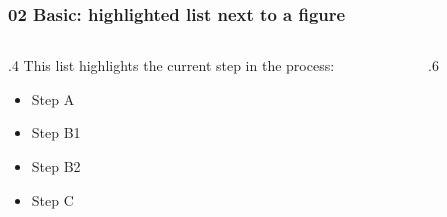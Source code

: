 
\begin{frame}
    \frametitle{02 Basic: highlighted list next to a figure}

    \newcommand{\stepNeutral}{1}
    \newcommand{\stepA}{2}
    \newcommand{\stepBOne}{3}
    \newcommand{\stepBTwo}{3}
    \newcommand{\stepC}{4}
    \newcommand{\stepAAndC}{5}

    \begin{columns}[T]
        \begin{column}{.4\textwidth}
            This list highlights the current step in the process:

            \vspace{.75em}

            \begin{itemize}\setlength{\itemsep}{1em}
                \item \alert<\stepA,\stepAAndC>{Step A}
                \item \alert<\stepBOne>{Step B1}
                \item \alert<\stepBTwo>{Step B2}
                \item \alert<\stepC,\stepAAndC>{Step C}
            \end{itemize}
        \end{column}
        \begin{column}{.6\textwidth}
            \begin{center}
                
            \end{center}
        \end{column}
    \end{columns}
\end{frame}
